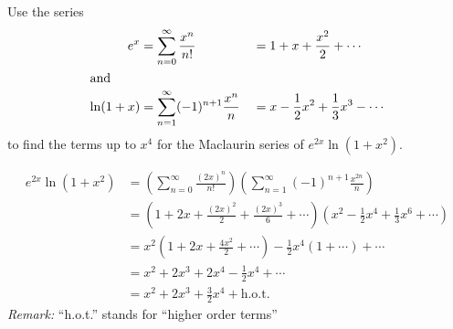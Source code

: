 \documentclass[12pt,answers]{exam}
\newcommand{\inv}{^{-1}}
\begin{document}
\begin{questions}

\newpage
\question[8]
Use the series
\begin{alignat*}{2}
    e^x      & = \sum_{n=0}^\infty \frac{x^n}{n!}
             &                                              & = 1 + x + \frac{x^2}{2} + \cdots         \\
    \intertext{and}
    \ln(1+x) & = \sum_{n=1}^\infty (-1)^{n+1} \frac{x^n}{n}
             &                                              & = x - \frac12 x^2 + \frac13 x^3 - \cdots
\end{alignat*}
to find the terms up to $x^4$ for the Maclaurin series of $e^{2x} \ln(1+x^2)$.
\begin{solution}
\begin{align*}
    e^{2x} \ln(1+x^2) 
    &= \left( \sum_{n=0}^\infty \frac{(2x)^n}{n!} \right) \left( \sum_{n=1}^\infty (-1)^{n+1} \frac{x^{2n}}{n}\right) \\ 
    &= \left(1 + 2x + \frac{(2x)^2}{2} + \frac{(2x)^3}{6} + \cdots \right) \left( x^2 - \frac12 x^{4} + \frac13 x^6 + \cdots \right) \\ 
    &= x^2 \left(1 + 2x + \frac{4x^2}{2} + \cdots \right) - \frac12 x^4 \left(1 + \cdots \right) + \cdots \\
    &= x^2 + 2x^3 + 2x^4 - \frac12 x^4 + \cdots \\
    &= \boxed{x^2 + 2x^3 + \frac 32 x^4} + \text{h.o.t.}
\end{align*}
\textit{Remark:} ``h.o.t.'' stands for ``higher order terms''
\end{solution}

\newpage
\question
\begin{parts}

\end{parts}
\end{questions}
\end{document}
